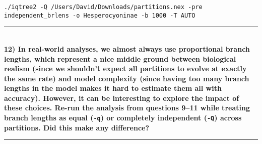 \documentclass[12pt]{article}
\begin{document}
\texttt{./iqtree2 -Q /Users/David/Downloads/partitions.nex -pre independent\_brlens -o Hesperocyoninae -b 1000 -T AUTO} \\

\hrule
\ \\[1ex]
\textbf{12) In real-world analyses, we almost always use proportional branch lengths, which represent a nice middle ground between biological realism (since we shouldn't expect all partitions to evolve at exactly the same rate) and model complexity (since having too many branch lengths in the model makes it hard to estimate them all with accuracy). However, it can be interesting to explore the impact of these choices. Re-run the analysis from questions 9--11 while treating branch lengths as equal (\texttt{-q}) or completely independent (\texttt{-Q}) across partitions. Did this make any difference?} \\
\hrule
\ \\[1ex]
\end{document}
